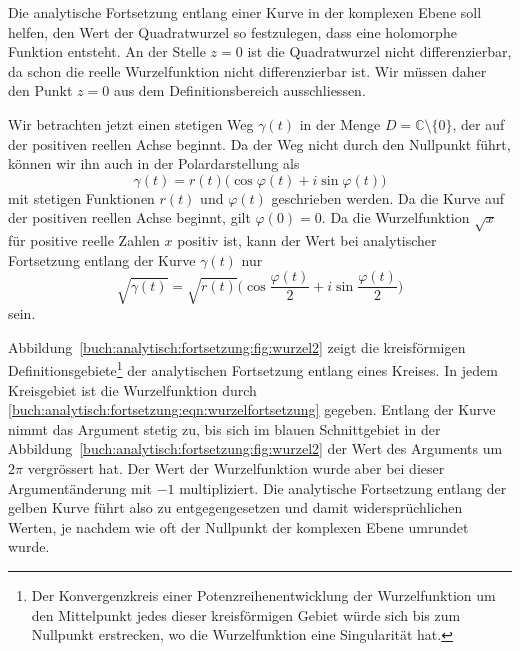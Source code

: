 Die analytische Fortsetzung entlang einer Kurve in der komplexen
Ebene soll helfen, den Wert der Quadratwurzel so festzulegen,
dass eine holomorphe Funktion entsteht.
An der Stelle $z=0$ ist die Quadratwurzel nicht differenzierbar,
da schon die reelle Wurzelfunktion nicht differenzierbar ist.
Wir müssen daher den Punkt $z=0$ aus dem Definitionsbereich
ausschliessen.

Wir betrachten jetzt einen stetigen Weg $\gamma(t)$ in der Menge
$D=\mathbb{C}\setminus\{0\}$, der auf der positiven reellen
Achse beginnt.
Da der Weg nicht durch den Nullpunkt führt, können wir ihn
auch in der Polardarstellung als
\[
\gamma(t)
=
r(t)
\bigl(
\cos\varphi(t)
+
i\sin\varphi(t)
\bigr)
\]
mit stetigen Funktionen $r(t)$ und $\varphi(t)$ geschrieben
werden.
Da die Kurve auf der positiven reellen Achse beginnt, gilt
$\varphi(0)=0$.
Da die Wurzelfunktion $\!\sqrt{x}$ für positive reelle Zahlen $x$
positiv ist, kann der Wert bei analytischer Fortsetzung entlang
der Kurve $\gamma(t)$ nur
\begin{equation}
\!\sqrt{\gamma(t)}
=
\!\sqrt{r(t)}
\biggl(
\cos\frac{\varphi(t)}2
+
i
\sin\frac{\varphi(t)}2
\biggr)
\label{buch:analytisch:fortsetzung:eqn:wurzelfortsetzung}
\end{equation}
sein.

Abbildung~\ref{buch:analytisch:fortsetzung:fig:wurzel2} zeigt die
kreisförmigen Definitionsgebiete\footnote{Der Konvergenzkreis
einer Potenzreihenentwicklung der Wurzelfunktion um den Mittelpunkt jedes
dieser kreisförmigen Gebiet würde sich bis zum Nullpunkt erstrecken,
wo die Wurzelfunktion eine Singularität hat.}
der analytischen Fortsetzung entlang eines Kreises.
In jedem Kreisgebiet ist die Wurzelfunktion durch 
\eqref{buch:analytisch:fortsetzung:eqn:wurzelfortsetzung}
gegeben.
Entlang der Kurve nimmt das Argument stetig zu, bis sich im
blauen Schnittgebiet in der
Abbildung~\ref{buch:analytisch:fortsetzung:fig:wurzel2}
der Wert des Arguments um $2\pi$ vergrössert hat.
Der Wert der Wurzelfunktion wurde aber bei dieser Argumentänderung
mit $-1$ multipliziert.
Die analytische Fortsetzung entlang der gelben Kurve führt also
zu entgegengesetzen und damit widersprüchlichen Werten, je nachdem wie
oft der Nullpunkt der komplexen Ebene umrundet wurde.

%
%
